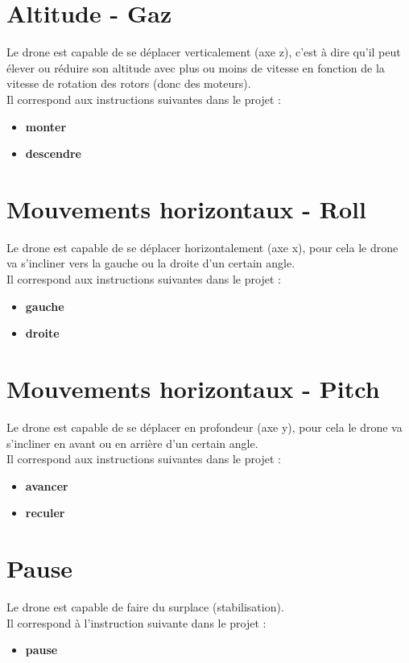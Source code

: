 \documentclass[12pt, openany]{report}
\begin{document}
\section{Altitude - Gaz}
Le drone est capable de se déplacer verticalement (axe z), c'est à dire qu'il peut élever ou réduire son altitude avec plus ou moins de vitesse en fonction de la vitesse de rotation des rotors (donc des moteurs). \\
Il correspond aux instructions suivantes dans le projet :
\begin{itemize}
     \item \textbf{monter}
     \item \textbf{descendre}
\end{itemize}
        
\section{Mouvements horizontaux - Roll}
Le drone est capable de se déplacer horizontalement (axe x), pour cela le drone va s'incliner vers la gauche ou la droite d'un certain angle. \\
Il correspond aux instructions suivantes dans le projet :
\begin{itemize}
     \item \textbf{gauche}
     \item \textbf{droite}
\end{itemize}
    
\section{Mouvements horizontaux - Pitch}
Le drone est capable de se déplacer en profondeur (axe y), pour cela le drone va s'incliner en avant ou en arrière d'un certain angle. \\
Il correspond aux instructions suivantes dans le projet :
\begin{itemize}
    \item \textbf{avancer}
    \item \textbf{reculer}
\end{itemize}
        
\section{Pause}
Le drone est capable de faire du surplace (stabilisation). \\
Il correspond à l'instruction suivante dans le projet :
\begin{itemize}
      \item \textbf{pause}
\end{itemize}
        
\end{document}
